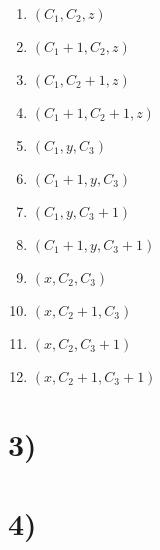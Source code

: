 \begin{enumerate}
\itemsep-1.5em 
\item $(C_1, C_2, z)$ \\
\item $(C_1+1, C_2, z)$ \\
\item $(C_1, C_2+1, z)$ \\
\item $(C_1+1, C_2+1, z)$ \\
\item $(C_1, y, C_3)$ \\
\item $(C_1+1, y, C_3)$ \\
\item $(C_1, y, C_3+1)$ \\
\item $(C_1+1, y, C_3+1)$ \\
\item $(x, C_2, C_3)$ \\
\item $(x, C_2+1, C_3)$ \\
\item $(x, C_2, C_3+1)$ \\
\item $(x, C_2+1, C_3+1)$ \\
\end{enumerate}

\section*{3)}

\section*{4)}
